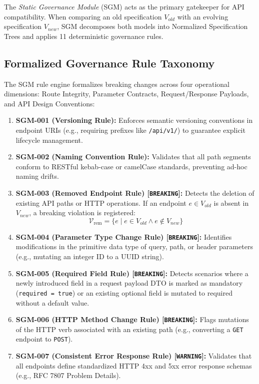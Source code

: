 \documentclass[conference]{IEEEtran}
\begin{document}
The \textit{Static Governance Module} (SGM) acts as the primary gatekeeper for API compatibility. When comparing an old specification $V_{old}$ with an evolving specification $V_{new}$, SGM decomposes both models into Normalized Specification Trees and applies 11 deterministic governance rules.

\subsection{Formalized Governance Rule Taxonomy}
The SGM rule engine formalizes breaking changes across four operational dimensions: Route Integrity, Parameter Contracts, Request/Response Payloads, and API Design Conventions:

\begin{enumerate}
    \item \textbf{SGM-001 (Versioning Rule):} Enforces semantic versioning conventions in endpoint URIs (e.g., requiring prefixes like \texttt{/api/v1/}) to guarantee explicit lifecycle management.
    \item \textbf{SGM-002 (Naming Convention Rule):} Validates that all path segments conform to RESTful kebab-case or camelCase standards, preventing ad-hoc naming drifts.
    \item \textbf{SGM-003 (Removed Endpoint Rule) [\texttt{BREAKING}]:} Detects the deletion of existing API paths or HTTP operations. If an endpoint $e \in V_{old}$ is absent in $V_{new}$, a breaking violation is registered:
    \begin{equation}
        \mathcal{V}_{\text{rem}} = \{ e \mid e \in V_{old} \land e \notin V_{new} \}
    \end{equation}
    \item \textbf{SGM-004 (Parameter Type Change Rule) [\texttt{BREAKING}]:} Identifies modifications in the primitive data type of query, path, or header parameters (e.g., mutating an integer ID to a UUID string).
    \item \textbf{SGM-005 (Required Field Rule) [\texttt{BREAKING}]:} Detects scenarios where a newly introduced field in a request payload DTO is marked as mandatory (\texttt{required = true}) or an existing optional field is mutated to required without a default value.
    \item \textbf{SGM-006 (HTTP Method Change Rule) [\texttt{BREAKING}]:} Flags mutations of the HTTP verb associated with an existing path (e.g., converting a \texttt{GET} endpoint to \texttt{POST}).
    \item \textbf{SGM-007 (Consistent Error Response Rule) [\texttt{WARNING}]:} Validates that all endpoints define standardized HTTP 4xx and 5xx error response schemas (e.g., RFC 7807 Problem Details).

\end{enumerate}
\end{document}

